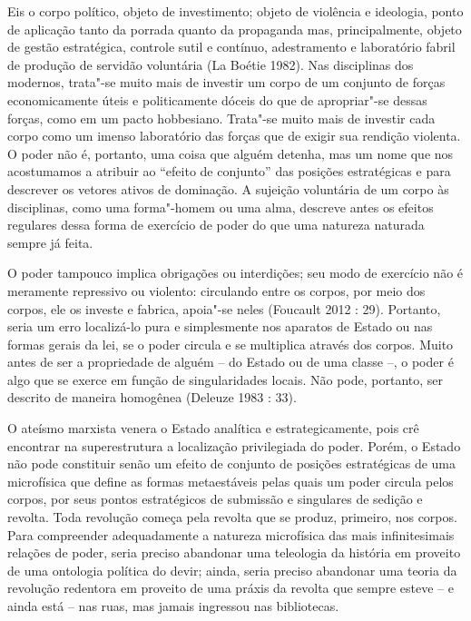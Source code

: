 Eis o corpo político, objeto de investimento; objeto de violência e
ideologia, ponto de aplicação tanto da porrada quanto da propaganda mas,
principalmente, objeto de gestão estratégica, controle sutil e contínuo,
adestramento e laboratório fabril de produção de servidão voluntária (La
Boétie 1982). Nas disciplinas dos modernos, trata"-se muito mais de
investir um corpo de um conjunto de forças economicamente úteis e
politicamente dóceis do que de apropriar"-se dessas forças, como em um
pacto hobbesiano. Trata"-se muito mais de investir cada corpo como um
imenso laboratório das forças que de exigir sua rendição violenta. O
poder não é, portanto, uma coisa que alguém detenha, mas um nome que nos
acostumamos a atribuir ao ``efeito de conjunto'' das posições
estratégicas e para descrever os vetores ativos de dominação. A sujeição
voluntária de um corpo às disciplinas, como uma forma"-homem ou uma alma,
descreve antes os efeitos regulares dessa forma de exercício de poder do
que uma natureza naturada sempre já feita.

O poder tampouco implica obrigações ou interdições; seu modo de
exercício não é meramente repressivo ou violento: circulando entre os
corpos, por meio dos corpos, ele os investe e fabrica, apoia"-se neles
(Foucault 2012 : 29). Portanto, seria um erro localizá-lo pura e
simplesmente nos aparatos de Estado ou nas formas gerais da lei, se o
poder circula e se multiplica através dos corpos. Muito antes de ser a
propriedade de alguém -- do Estado ou de uma classe --, o poder é algo
que se exerce em função de singularidades locais. Não pode, portanto,
ser descrito de maneira homogênea (Deleuze 1983 : 33).

O ateísmo marxista venera o Estado analítica e estrategicamente, pois
crê encontrar na superestrutura a localização privilegiada do poder.
Porém, o Estado não pode constituir senão um efeito de conjunto de
posições estratégicas de uma microfísica que define as formas
metaestáveis pelas quais um poder circula pelos corpos, por seus pontos
estratégicos de submissão e singulares de sedição e revolta. Toda
revolução começa pela revolta que se produz, primeiro, nos corpos. Para
compreender adequadamente a natureza microfísica das mais infinitesimais
relações de poder, seria preciso abandonar uma teleologia da história em
proveito de uma ontologia política do devir; ainda, seria preciso
abandonar uma teoria da revolução redentora em proveito de uma práxis da
revolta que sempre esteve -- e ainda está -- nas ruas, mas jamais
ingressou nas bibliotecas.

